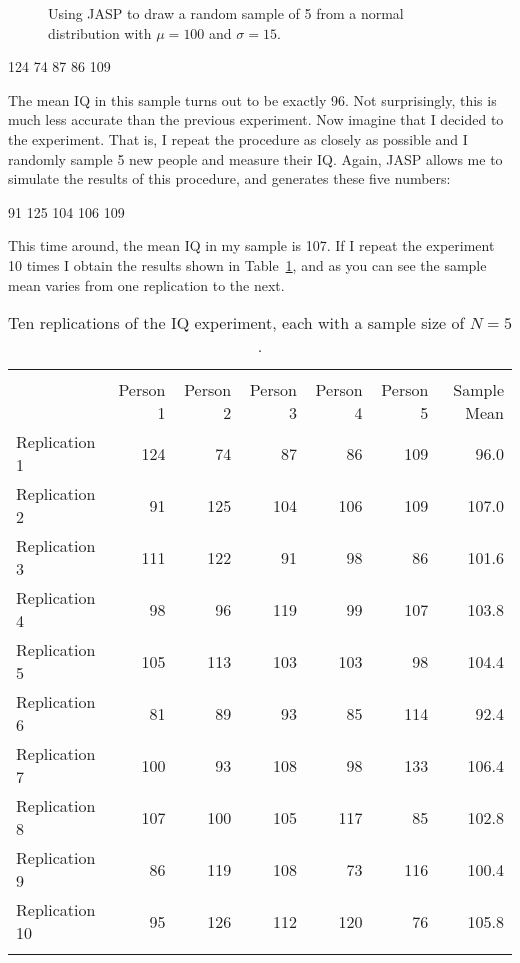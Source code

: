 \begin{figure}[p]
\begin{center}
\end{center}
\caption{Using JASP to draw a random sample of 5 from a normal distribution with $\mu=100$ and $\sigma=15$.}
\label{fig:IQsample}
\HR
\end{figure}

\begin{rblock1}
124 74 87 86 109
\end{rblock1}

The mean IQ in this sample turns out to be exactly 96. Not surprisingly, this is much less accurate than the previous experiment. Now imagine that I decided to  the experiment. That is, I repeat the procedure as closely as possible and I randomly sample 5 new people and measure their IQ. Again, JASP allows me to simulate the results of this procedure, and generates these five numbers:

\begin{rblock1}
91 125 104 106 109
\end{rblock1}

This time around, the mean IQ in my sample is 107. If I repeat the experiment 10 times I obtain the results shown in Table~\ref{tab:replications}, and as you can see the sample mean varies from one replication to the next. 

\begin{table}[t]
\centering
\caption{Ten replications of the IQ experiment, each with a sample size of $N=5$.}
\label{tab:replications}
\begin{tabular}{l|rrrrr|r}
 \multicolumn{6}{c}{} \\
 & Person 1 & Person 2 & Person 3 & Person 4 & Person 5 & Sample Mean \\ 
  \hline
Replication 1 & 124 & 74 & 87 & 86 & 109 & 96.0 \\ 
  Replication 2 & 91 & 125 & 104 & 106 & 109 & 107.0 \\ 
  Replication 3 & 111 & 122 & 91 & 98 & 86 & 101.6 \\ 
  Replication 4 & 98 & 96 & 119 & 99 & 107 & 103.8 \\ 
  Replication 5 & 105 & 113 & 103 & 103 & 98 & 104.4 \\ 
  Replication 6 & 81 & 89 & 93 & 85 & 114 & 92.4 \\ 
  Replication 7 & 100 & 93 & 108 & 98 & 133 & 106.4 \\ 
  Replication 8 & 107 & 100 & 105 & 117 & 85 & 102.8 \\ 
  Replication 9 & 86 & 119 & 108 & 73 & 116 & 100.4 \\ 
  Replication 10 & 95 & 126 & 112 & 120 & 76 & 105.8 \\ 
  \multicolumn{6}{c}{} \\
\end{tabular}
\HR
\end{table}

